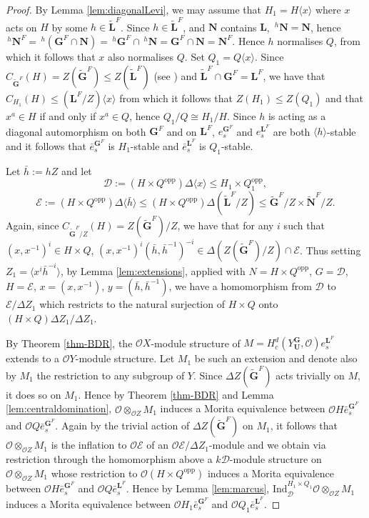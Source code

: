 \documentclass{amsart}
\theoremstyle{plain}\newtheorem{Theorem}{Theorem}[section]
\theoremstyle{plain}\newtheorem{Conjecture}[Theorem]{Conjecture}
\theoremstyle{plain}\newtheorem{Corollary}[Theorem]{Corollary}
\theoremstyle{plain}\newtheorem{Lemma}[Theorem]{Lemma}
\theoremstyle{plain}\newtheorem{Proposition}[Theorem]{Proposition}
\theoremstyle{definition}\newtheorem{Definition}[Theorem]{Definition}
\theoremstyle{definition}\newtheorem{Example}[Theorem]{Example}
\theoremstyle{definition}\newtheorem{Examples}[Theorem]{Examples}
\theoremstyle{definition}\newtheorem{Exercise}[Theorem]{Exercise}
\theoremstyle{definition}\newtheorem{Notation}[Theorem]{Notation}
\theoremstyle{definition}\newtheorem{Remark}[Theorem]{Remark}
\theoremstyle{definition}\newtheorem{Remarks}[Theorem]{Remarks}
\def\CD{{\mathcal{D}}} \def\OQ{{\mathcal{O}Q}} \def\OGf{{\mathcal{O}Gf}}
\def\CE{{\mathcal{E}}}  \def\OR{{\mathcal{O}R}}
\def\CO{{\mathcal{O}}}    \def\OPE{{\mathcal{O}(P\rtimes E)}}
\def\Ind{\mathrm{Ind}}    \def\tenC{\otimes_C}
\def\opp{\mathrm{opp}}
\newcommand{\bG}{{\mathbf{G}}}
\newcommand{\bL}{{\mathbf{L}}}
\newcommand{\bN}{{\mathbf{N}}}
\newcommand{\bU}{{\mathbf{U}}}
\numberwithin{equation}{section}
\begin{document}
\begin{proof}   
By Lemma \ref{lem:diagonalLevi},  we may assume that   $H_1 = H \langle  x \rangle   $  where $x$ acts   on $H$ by  some   $  h  \in \tilde \bL^F$.  
 Since $h \in \tilde \bL^F$, and $\bN$  contains $\bL$,  $\,^h \bN  =\bN  $, hence $\,^h \bN^F = \,^h(\bG^F \cap \bN ) = \,^h \bG^F \cap \,^h \bN =  \bG^F \cap \bN = \bN^F $.   Hence $h$  normalises  $Q$, from which it follows that    $x$  also normalises  $Q$.   Set $Q_1 =  Q \langle x \rangle$.   Since $C_{\tilde \bG^F} (H) =  Z(\tilde\bG^F)  \leq Z(\tilde \bL^F)$ (see ) and  $\tilde \bL^F \cap \bG^F= \bL^F$, we  have that  $C_{H_1} (H)  \leq  (\bL^F/Z)\langle x \rangle$  from which it follows that  $Z(H_1) \leq  Z(Q_1) $  and that $x^a \in   H$  if and only if $x^a  \in  Q$,  hence $Q_1/ Q  \cong  H_1/H$.
 Since  $h$  is  acting as a diagonal automorphism on both $\bG^F$ and on $\bL^F$, $e_s^{\bG^F}$ and  $ e_s^{\bL^F}$  are both $\langle h \rangle$-stable and it follows that  $\bar e_s^{\bG^F}$  is $H_1$-stable and  $\bar e_s^{\bL^F} $ is $Q_1$-stable.

Let $\bar h:= h Z$   and let   $$\CD :=  (H \times Q^{\opp} ) \Delta \langle x  \rangle\leq  H_1 \times Q_1^{\opp}, $$ $$\CE:= (H\times Q^{\opp} )\Delta  \langle \bar h \rangle \leq  (H\times Q^{\opp} )\Delta (\tilde \bL^F/Z )\leq  \tilde \bG^F /Z\times \tilde \bN^F/Z. $$ Again,   since $C_{\tilde  \bG^F/Z} (H) =  Z(\tilde \bG^F)/Z  $, we have that  for any  $i$ such that $(x, x^{-1})^i  \in H \times Q$,    
 $ (x, x^{-1}) ^i (\bar h, \bar h^{-1})^{-i}  \in \Delta (Z(\tilde \bG^F )/Z)\cap  \CE $.  Thus  setting  $Z_1=   \langle x^i \bar h^{-i}\rangle  $,   by Lemma \ref{lem:extensions}, applied    with $N=H \times Q^{\opp}$, $G  =\CD$, $H= \CE$, $x = (x, x^{-1}) $,  $y=(\bar h, \bar h^{-1})$,  we have a  homomorphism from $\CD$  to  $\CE/\Delta Z_1$   which   restricts to the  natural  surjection  of $H \times Q $ onto $(H \times Q) \Delta Z_1/\Delta Z_1$. 
 
 
 By Theorem  \ref{thm-BDR}, the $\CO X$-module   structure of  $M=  H_c^d (Y_{\bU}^{\bG}, \CO) e_s^{\bL^F}$ extends to a $\CO Y$-module structure. Let 
$M_1$ be such  an extension  and denote also by $M_1$   the  restriction to any  subgroup of $Y$.  Since  $  \Delta Z(\tilde \bG^F) $   acts trivially on  $M$, it does so on $M_1$. Hence by  Theorem \ref{thm-BDR}  and  Lemma \ref{lem:centraldomination},  $\CO \otimes_{\CO Z}M_1$  induces a  Morita equivalence between  $\CO H \bar e_s^{\bG^F} $ and  $ \CO Q  \bar  e_s^{\bG^F} $.   Again  by the trivial action of  $\Delta Z(\tilde \bG^F) $ on $M_1$, it follows that   $\CO \otimes_{\CO Z} M_1$ is  the  inflation  to   $\CO \mathcal {E} $  of an  $\CO \mathcal {E}/\Delta Z_1$-module  and we obtain 
via  restriction through the  homomorphism  above  a  $k\CD$-module structure on $\CO \otimes_{\CO Z} M_1$  whose   restriction to    $\CO(H\times Q^{\opp})$  induces a  Morita equivalence between $\CO H \bar  e_{s}^{\bG^F}$  and  $\CO Q\bar e_s^{\bL^F}$. Hence by Lemma \ref{lem:marcus}, $\Ind_{\CD}^{H_1 \times Q_1} \CO \otimes_{\CO Z} M_1$ induces a Morita equivalence between  $\CO H_1 \bar e_{s}^{\bG^F}$  and  $\CO Q_1 \bar e_s^{\bL^F}$.
\end{proof} 
\end{document}
